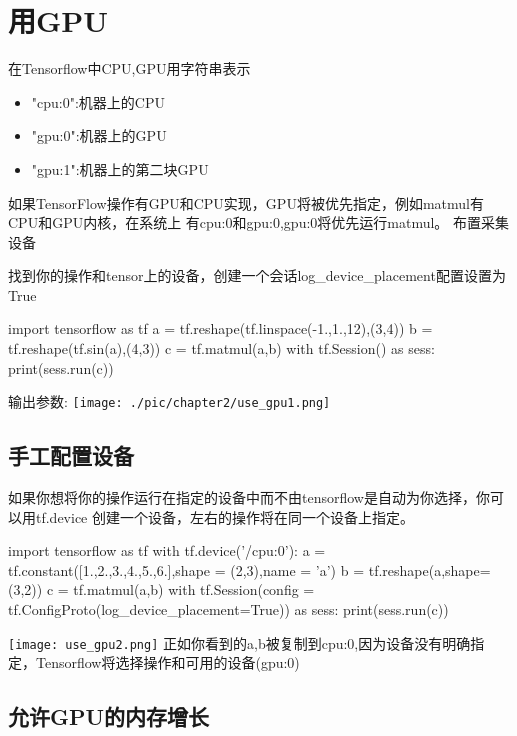 \section{用GPU}
在Tensorflow中CPU,GPU用字符串表示
\begin{itemize}
\item "cpu:0":机器上的CPU
\item "gpu:0":机器上的GPU
\item "gpu:1":机器上的第二块GPU
\end{itemize}
 如果TensorFlow操作有GPU和CPU实现，GPU将被优先指定，例如matmul有CPU和GPU内核，在系统上 有cpu:0和gpu:0,gpu:0将优先运行matmul。
布置采集设备

找到你的操作和tensor上的设备，创建一个会话log\_device\_placement配置设置为True
\begin{python}
import tensorflow as tf
a = tf.reshape(tf.linspace(-1.,1.,12),(3,4))
b = tf.reshape(tf.sin(a),(4,3))
c = tf.matmul(a,b)
with tf.Session() as sess:
    print(sess.run(c))
\end{python}
输出参数:\newline
\texttt{[image: ./pic/chapter2/use\_gpu1.png]}\newline
\subsection{手工配置设备}
如果你想将你的操作运行在指定的设备中而不由tensorflow是自动为你选择，你可以用tf.device 创建一个设备，左右的操作将在同一个设备上指定。
\begin{python}
import tensorflow as tf
with tf.device('/cpu:0'):
    a = tf.constant([1.,2.,3.,4.,5.,6.],shape = (2,3),name = 'a')
    b = tf.reshape(a,shape=(3,2))
    c = tf.matmul(a,b)
    with tf.Session(config = tf.ConfigProto(log_device_placement=True)) as sess:
        print(sess.run(c))
\end{python}
\texttt{[image: use\_gpu2.png]}\newline
正如你看到的a,b被复制到cpu:0,因为设备没有明确指定，Tensorflow将选择操作和可用的设备(gpu:0)

\subsection{允许GPU的内存增长}

